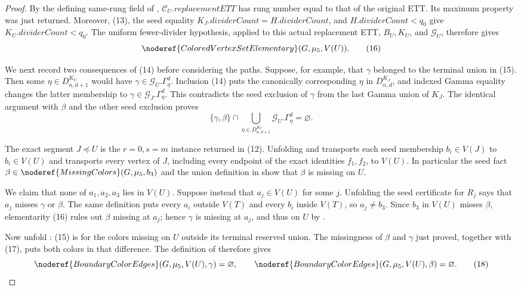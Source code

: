 \begin{proof}
By the defining same-rung field of
,
$\mathcal C_U.\mathit{replacementETT}$ has rung number equal to that of
the original ETT.  Its maximum property was just returned.  Moreover,
(13), the seed equality
$K_J.\mathit{dividerCount}=H.\mathit{dividerCount}$, and
$H.\mathit{dividerCount}<q_0$ give
$K_U.\mathit{dividerCount}<q_0$.  The uniform fewer-divider hypothesis,
applied to this actual replacement ETT, $B_U,K_U$, and $\mathcal G_U$,
therefore gives
\[
          \noderef{ColoredVertexSetElementary}(G,\mu_5,V(U)). \tag{16}
\]

We next record two consequences of (14) before considering the paths.
Suppose, for example, that $\gamma$ belonged to the terminal union in
(15).  Then some
$\eta\in D^{K_U}_{n,d+1}$ would have
$\gamma\in\mathcal G_U.\Gamma^d_\eta$.  Inclusion (14) puts the
canonically corresponding $\eta$ in $D^{K_J}_{n,d}$, and indexed Gamma
equality changes the latter membership to
$\gamma\in\mathcal G_J.\Gamma^d_\eta$.  This contradicts the seed
exclusion of $\gamma$ from the last Gamma union of $K_J$.  The identical
argument with $\beta$ and the other seed exclusion proves
\[
 \{\gamma,\beta\}\cap
 \bigcup_{\eta\in D^{K_U}_{n,d+1}}
       \mathcal G_U.\Gamma^d_\eta=\varnothing.                 \tag{17}
\]

The exact segment $J\preccurlyeq U$ is the $r=0,s=m$ instance returned
in (12).  Unfolding  and
 transports each seed membership
$b_i\in V(J)$ to $b_i\in V(U)$ and transports every vertex of $J$,
including every endpoint of the exact identities $f_1,f_2$, to $V(U)$.
In particular the seed fact $\beta\in\noderef{MissingColors}(G,\mu_5,b_3)$
and the union definition in  show that
$\beta$ is missing on $U$.

We claim that none of $a_1,a_2,a_3$ lies in $V(U)$.  Suppose instead that
$a_j\in V(U)$ for some $j$.  Unfolding the seed
 certificate for $R_j$ says that $a_j$ misses
$\gamma$ or $\beta$.  The same definition puts every $a_i$ outside
$V(T)$ and every $b_i$ inside $V(T)$, so $a_j\ne b_3$.  Since $b_3$ in
$V(U)$ misses $\beta$, elementarity (16) rules out $\beta$ missing at
$a_j$; hence $\gamma$ is missing at $a_j$, and thus on $U$ by
.

Now unfold : (15) is
 for the colors missing on $U$ outside its
terminal reserved union.  The missingness of $\beta$ and $\gamma$ just
proved, together with (17), puts both colors in that difference.  The
definition of  therefore gives
\[
 \noderef{BoundaryColorEdges}(G,\mu_5,V(U),\gamma)=\varnothing,
 \qquad
 \noderef{BoundaryColorEdges}(G,\mu_5,V(U),\beta)=\varnothing. \tag{18}
\]


\end{proof}
